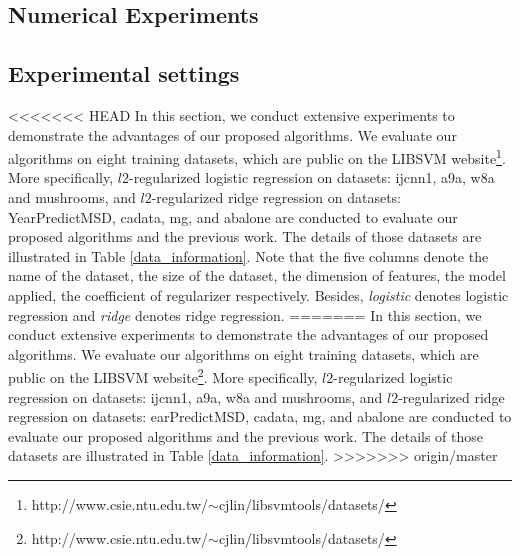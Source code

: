 \documentclass[conference]{IEEEtran}
\begin{document}
\begin{algorithm}[t]
\begin{itemize}
 
 \section{Numerical Experiments}
 \label{numexperiments}
 \subsection{Experimental settings}
<<<<<<< HEAD
 In this section, we conduct extensive experiments to demonstrate the advantages of our proposed algorithms. We evaluate our algorithms on eight training datasets, which are public on the LIBSVM website\footnote{http://www.csie.ntu.edu.tw/$\sim$cjlin/libsvmtools/datasets/}. More specifically,  $l2$-regularized logistic regression on datasets: ijcnn1, a9a, w8a and mushrooms, and $l2$-regularized ridge regression on datasets: YearPredictMSD, cadata, mg, and abalone  are conducted to evaluate our proposed algorithms and the previous work.  The details of those datasets are illustrated in Table \ref{data_information}. Note that the five columns denote the name of the dataset, the size of the dataset, the dimension of features, the model applied, the coefficient of regularizer respectively. Besides, \emph{logistic} denotes logistic regression and \emph{ridge} denotes ridge regression. 
=======
 In this section, we conduct extensive experiments to demonstrate the advantages of our proposed algorithms. We evaluate our algorithms on eight training datasets, which are public on the LIBSVM website\footnote{http://www.csie.ntu.edu.tw/$\sim$cjlin/libsvmtools/datasets/}. More specifically,  $l2$-regularized logistic regression on datasets: ijcnn1, a9a, w8a and mushrooms, and $l2$-regularized ridge regression on datasets: earPredictMSD, cadata, mg, and abalone  are conducted to evaluate our proposed algorithms and the previous work.  The details of those datasets are illustrated in Table \ref{data_information}.
>>>>>>> origin/master
 

\end{itemize}
\end{algorithm}
\end{document}
